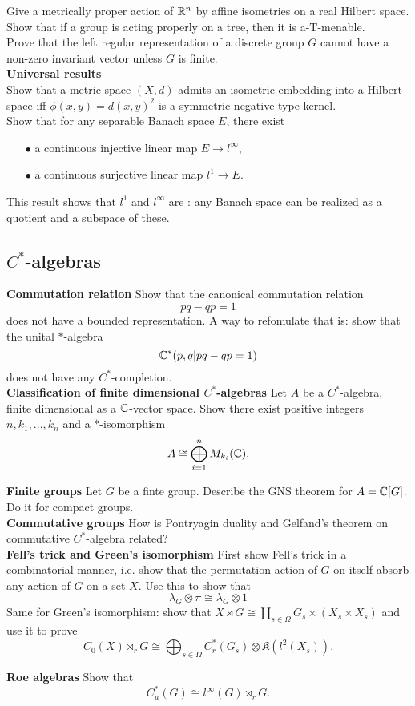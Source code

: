 Give a  metrically proper action of $\mathbb R^n$ by affine isometries on a real Hilbert space.\\

Show that if a group is acting properly on a tree, then it is a-T-menable.\\

Prove that the left regular representation of a discrete group $G$ cannot have a non-zero invariant vector unless $G$ is finite.\\

\textbf{Universal results} \\

Show that a metric space $(X,d)$ admits an isometric embedding into a Hilbert space iff $\phi(x,y) = d(x,y)^2$ is a symmetric negative type kernel.\\

Show that for any separable Banach space $E$, there exist
\begin{itemize}
\item[$\bullet$] a continuous injective linear map $E\rightarrow l^\infty$,
\item[$\bullet$] a continuous surjective linear map $l^1 \rightarrow E$.   
\end{itemize}
This result shows that $l^1$ and $l^\infty$ are : any Banach space can be realized as a quotient and a subspace of these.

\subsection{$C^*$-algebras}

\textbf{Commutation relation} Show that the canonical commutation relation \[ pq-qp = 1\]
does not have a bounded representation. A way to refomulate that is: show that the unital $*$-algebra 
\[ \mathbb C^*( p,q | pq-qp =1)\]
does not have any $C^*$-completion.\\

\textbf{Classification of finite dimensional $C^*$-algebras} Let $A$ be a $C^*$-algebra, finite dimensional as a $\mathbb C$-vector space. Show there exist positive integers $n,k_1,...,k_n$ and a $*$-isomorphism
\[A\cong \bigoplus_{i=1}^n M_{k_i}(\mathbb C).\]

\textbf{Finite groups} Let $G$ be a finte group. Describe the GNS theorem for $A=\mathbb C[G]$. Do it for compact groups.\\

\textbf{Commutative groups} How is Pontryagin duality and Gelfand's theorem on commutative $C^*$-algebra related?\\

\textbf{Fell's trick and Green's isomorphism}
First show Fell's trick in a combinatorial manner, i.e. show that the permutation action of $G$ on itself absorb any action of $G$ on a set $X$. Use this to show that 
\[\lambda_G \otimes \pi \cong \lambda_G \otimes 1\]
Same for Green's isomorphism: show that $X\rtimes G \cong \coprod_{s\in \Omega} G_s\times (X_s\times X_s)$ and use it to prove
\[C_0(X)\rtimes_r G \cong \bigoplus_{s\in \Omega} C^*_r(G_s)\otimes \mathfrak K(l^2(X_s)). \]

\textbf{Roe algebras}
Show that 
\[C^*_u(G) \cong l^\infty(G)\rtimes_r G.\]

 
